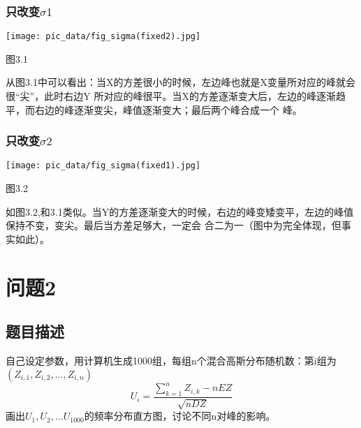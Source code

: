 \documentclass{ctexart}
\begin{document}
    \subsubsection{只改变$\sigma1$}
    \centerline{\texttt{[image: pic\_data/fig\_sigma(fixed2).jpg]}}
    \centerline{图3.1}
    从图3.1中可以看出：当X的方差很小的时候，左边峰也就是X变量所对应的峰就会很“尖”，此时右边Y
    所对应的峰很平。当X的方差逐渐变大后，左边的峰逐渐趋平，而右边的峰逐渐变尖，峰值逐渐变大；最后两个峰合成一个
    峰。
    \subsubsection{只改变$\sigma2$}
    \centerline{\texttt{[image: pic\_data/fig\_sigma(fixed1).jpg]}}
    \centerline{图3.2}
    如图3.2,和3.1类似。当Y的方差逐渐变大的时候，右边的峰变矮变平，左边的峰值保持不变，变尖。最后当方差足够大，一定会
    合二为一（图中为完全体现，但事实如此）。

    \section{问题2}
    \subsection{题目描述}
      自己设定参数，用计算机生成1000组，每组n个混合高斯分布随机数：第i组为$(Z_{i, 1}, Z_{i, 2}, ..., Z_{i, n})$
      \begin{equation*}
        U_i = \frac{\sum_{k=1}^{n}Z_{i, k} - nEZ}{\sqrt{nDZ}}
      \end{equation*}
      画出$U_1, U_2, ... U_1000$的频率分布直方图，讨论不同n对峰的影响。
\end{document}
